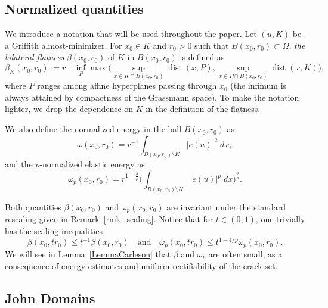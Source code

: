 \documentclass[12pt]{article}
\theoremstyle{definition}
\theoremstyle{remark}
\numberwithin{equation}{section}
\DeclareMathOperator{\dist}{dist}
\begin{document}
\subsection{Normalized quantities}

We introduce a notation that will be used throughout the paper. Let $(u,K)$ be a Griffith almost-minimizer. For $x_0 \in K$
and $r_0 > 0$ such that $B(x_0,r_0) \subset \Omega$, \emph{the bilateral flatness} $\beta(x_0,r_0)$ of $K$ in
$B(x_0,r_0)$ is defined as
\begin{equation}
    \beta_K(x_0,r_0) := r^{-1} \inf_{P} \max\biggl(\sup_{x \in K \cap B(x_0,r_0)} \dist(x,P), \sup_{x \in P \cap
    B(x_0,r_0)} \dist(x,K)\biggr),
\end{equation}
where $P$ ranges among affine hyperplanes passing through $x_0$ (the infimum is always attained by compactness of the
Grassmann space). 
To make the notation lighter, we drop the dependence on $K$ in the definition of the flatness.

We also define the normalized energy in the ball $B(x_0,r_0)$ as
\begin{equation}
    \omega(x_0,r_0)=r^{-1} \int_{B(x_0,r_0)\setminus K} |e(u)|^2 \;dx,
\end{equation}
and the $p$-normalized elastic energy as
\begin{equation}
    \omega_p(x_0,r_0)=r^{1-\frac{4}{p}}\biggl(\int_{B(x_0,r_0)\setminus K} |e(u)|^p \;dx\biggr)^\frac{2}{p}.
\end{equation}

Both quantities $\beta(x_0,r_0)$ and $\omega_p(x_0,r_0)$ are invariant under the standard rescaling given in
Remark~\ref{rmk_scaling}. Notice that for $t \in (0,1)$, one trivially has the scaling inequalities
\begin{equation}\label{eq_scaling}
    \beta(x_0,tr_0) \leq t^{-1} \beta(x_0,r_0) \quad \text{and} \quad \omega_p(x_0,t r_0) \leq t^{1-4/p} \omega_p(x_0,r_0).
\end{equation}
We will see in Lemma~\ref{LemmaCarleson} that $\beta$ and $\omega_p$ are often small, as a consequence of
energy estimates and uniform rectifiability of the crack set.

\subsection{John Domains} \label{sectionJohn}
\end{document}
